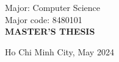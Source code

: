 \documentclass[a4paper,oneside]{book}
\begin{document}
\begin{titlepage}
\begin{center}
        \vspace{0.8cm}
        {\fontsize{14.4pt}{1} Major: Computer Science}\\[.2cm]

        \vspace{0.2cm}
        {\fontsize{14.4pt}{1} Major code: 8480101}\\[.2cm]

        \vspace{0.8cm}
        {\fontsize{14.4pt}{1}\selectfont \textbf{MASTER'S THESIS}}
    \end{center}

    \vspace{1.0cm}

    \hspace{.5cm}

    \begin{center}
        {{\fontsize{12pt}{1} Ho Chi Minh City, May 2024}}
    \end{center}
\end{titlepage}
\end{document}

